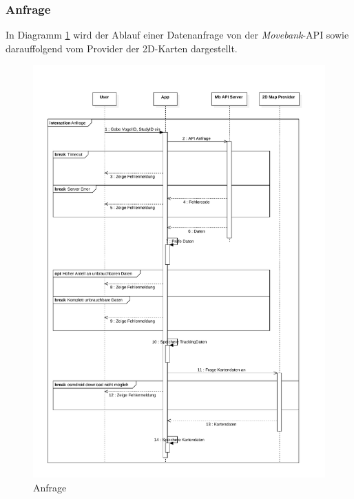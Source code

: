 \documentclass[12pt]{article} %
\begin{document}
\subsubsection{Anfrage}
In Diagramm \ref{seqDiagAnfrage} wird der Ablauf einer Datenanfrage von der \textit{Movebank}-API sowie darauffolgend vom Provider der 2D-Karten dargestellt.
\begin{figure}[h]
		\includegraphics[height=0.95\textheight,trim={0 1cm 5cm 2cm}]{Diagramme/SeqDiag-Abfrage.pdf}
		\caption{Anfrage}
		\label{seqDiagAnfrage}
	\hspace*{\fill}
\end{figure}
\end{document}
